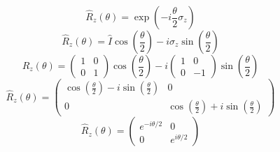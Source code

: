 \begin{equation}
    \hat{R}_z(\theta) = \exp\left(-i \frac{\theta}{2} \sigma_z\right)
\end{equation}
\begin{equation}
    \hat{R}_z(\theta) = \hat{I} \cos\left(\frac{\theta}{2}\right) - i \sigma_z \sin\left(\frac{\theta}{2}\right)
\end{equation}
\begin{equation}
    \hat{R}_z(\theta) = \begin{pmatrix} 1 & 0 \\ 0 & 1 \end{pmatrix} \cos\left(\frac{\theta}{2}\right) - i \begin{pmatrix} 1 & 0 \\ 0 & -1 \end{pmatrix} \sin\left(\frac{\theta}{2}\right)
\end{equation}
\begin{equation}
    \hat{R}_z(\theta) = \begin{pmatrix} \cos\left(\frac{\theta}{2}\right) - i \sin\left(\frac{\theta}{2}\right) & 0 \\ 0 & \cos\left(\frac{\theta}{2}\right) + i \sin\left(\frac{\theta}{2}\right) \end{pmatrix}
\end{equation}
\begin{equation}
    \hat{R}_z(\theta) = \begin{pmatrix} e^{-i\theta/2} & 0 \\ 0 & e^{i\theta/2} \end{pmatrix}
\end{equation}

